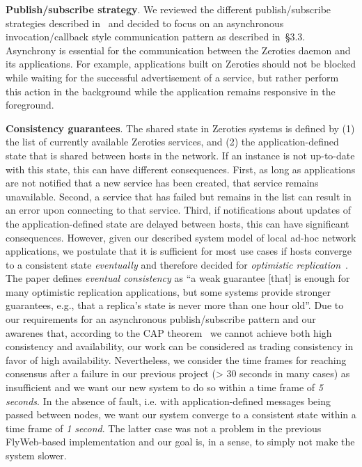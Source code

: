 \textbf{Publish/subscribe strategy}. 
We reviewed the different publish/subscribe strategies described in~\cite{eugster_2003} and decided to focus on an asynchronous invocation/callback style communication pattern as described in~\cite{eugster_2003}§3.3. 
Asynchrony is essential for the communication between the Zeroties daemon and its applications.
For example, applications built on Zeroties should not be blocked while waiting for the successful advertisement of a service, but rather perform this action in the background while the application remains responsive in the foreground.

\textbf{Consistency guarantees}.
The shared state in Zeroties systems is defined by (1) the list of currently available Zeroties services, and (2) the application-defined state that is shared between hosts in the network.
If an instance is not up-to-date with this state, this can have different consequences. 
First, as long as applications are not notified that a new service has been created, that service remains unavailable.
Second, a service that has failed but remains in the list can result in an error upon connecting to that service.
Third, if notifications about updates of the application-defined state are delayed between hosts, this can have significant consequences.
However, given our described system model of local ad-hoc network applications, we postulate that it is sufficient for most use cases if hosts converge to a consistent state \textit{eventually} and therefore decided for \textit{optimistic replication}~\cite{saito_2005}.
The paper defines \textit{eventual consistency} as ``a weak guarantee [that] is enough for many optimistic replication applications, but some systems provide stronger guarantees, e.g., that a replica's state is never more than one hour old''.
Due to our requirements for an asynchronous publish/subscribe pattern and our awarenes that, according to the CAP theorem~\cite{gilbert_2012} we cannot achieve both high consistency and availability, our work can be considered as trading consistency in favor of high availability.
Nevertheless, we consider the time frames for reaching consensus after a failure in our previous project (> 30 seconds in many cases) as insufficient and we want our new system to do so within a time frame of \textit{5 seconds}.
In the absence of fault, i.e. with application-defined messages being passed between nodes, 
we want our system converge to a consistent state within a time frame of \textit{1 second}.
The latter case was not a problem in the previous FlyWeb-based implementation and our goal is, in a sense, to simply not make the system slower.

